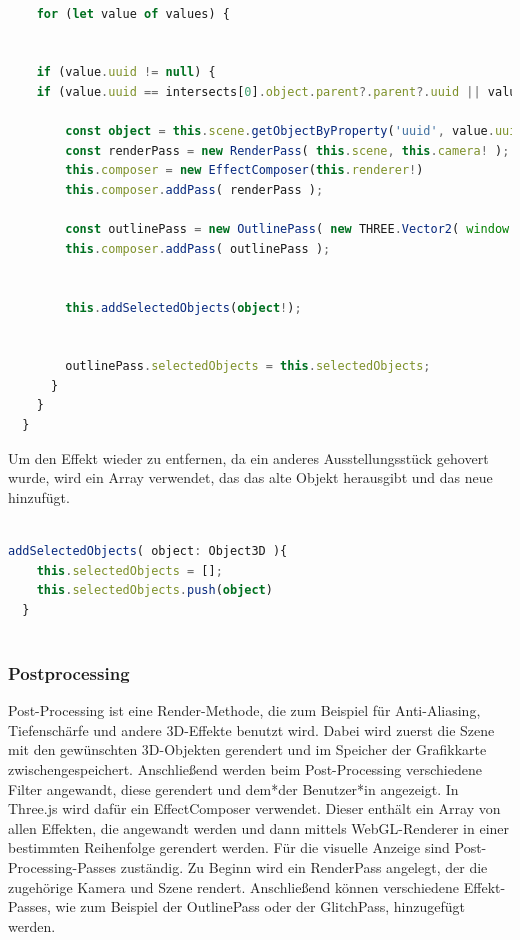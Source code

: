 \begin{lstlisting}[caption={Intersects als Ausstellungsstück identifizieren},language=TypeScript]
    
    for (let value of values) {


    if (value.uuid != null) {
    if (value.uuid == intersects[0].object.parent?.parent?.uuid || value.uuid == intersects[0].object.uuid) {

        const object = this.scene.getObjectByProperty('uuid', value.uuid);
        const renderPass = new RenderPass( this.scene, this.camera! );
        this.composer = new EffectComposer(this.renderer!)
        this.composer.addPass( renderPass );
    
        const outlinePass = new OutlinePass( new THREE.Vector2( window.innerWidth, window.innerHeight ), this.scene, this.camera! );
        this.composer.addPass( outlinePass );


        this.addSelectedObjects(object!);


        outlinePass.selectedObjects = this.selectedObjects;
      }
    }
  }

\end{lstlisting}

Um den Effekt wieder zu entfernen, da ein anderes Ausstellungsstück gehovert wurde, wird ein Array verwendet, das das alte Objekt herausgibt und das neue hinzufügt.

\begin{lstlisting}[caption={Hover-effekt wieder entfernen},language=TypeScript]
    
addSelectedObjects( object: Object3D ){
    this.selectedObjects = [];
    this.selectedObjects.push(object)
  }
    
\end{lstlisting}

\subsubsection{Postprocessing}
Post-Processing ist eine Render-Methode, die zum Beispiel für Anti-Aliasing, Tiefenschärfe und andere 3D-Effekte benutzt wird. Dabei wird zuerst die Szene mit den gewünschten 3D-Objekten gerendert und im Speicher der Grafikkarte zwischengespeichert. Anschließend werden beim Post-Processing verschiedene Filter angewandt, diese gerendert und dem*der Benutzer*in angezeigt. In Three.js wird dafür ein EffectComposer verwendet. Dieser enthält ein Array von allen Effekten, die angewandt werden und dann mittels WebGL-Renderer in einer bestimmten Reihenfolge gerendert werden. Für die visuelle Anzeige sind Post-Processing-Passes zuständig. Zu Beginn wird ein RenderPass angelegt, der die zugehörige Kamera und Szene rendert. Anschließend können verschiedene Effekt-Passes, wie zum Beispiel der OutlinePass oder der GlitchPass, hinzugefügt werden. \cite{PostProcessing}

